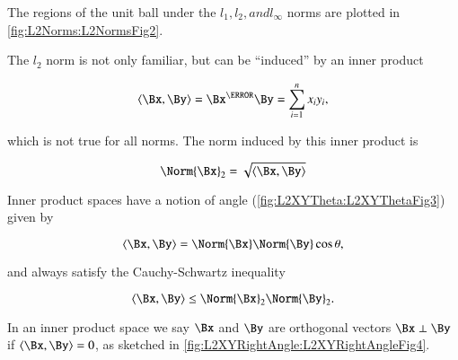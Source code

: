 
The regions of the unit ball under the \( l_1, l_2, and l_\infty \) norms are plotted in \cref{fig:L2Norms:L2NormsFig2}.


The \( l_2 \) norm is not only familiar, but can be ``induced'' by an inner product

\begin{equation}\label{eqn:convex-optimizationLecture2:84}
\innerproduct{\Bx}{\By} = \Bx^\T \By = \sum_{i = 1}^n x_i y_i,
\end{equation}

which is not true for all norms.  The norm induced by this inner product is

\begin{dmath}\label{eqn:convex-optimizationLecture2:104}
\Norm{\Bx}_2 = \sqrt{ \innerproduct{\Bx}{\By} }
\end{dmath}

Inner product spaces have a notion of angle
(\cref{fig:L2XYTheta:L2XYThetaFig3})
given by

\begin{dmath}\label{eqn:convex-optimizationLecture2:124}
\innerproduct{\Bx}{\By} = \Norm{\Bx} \Norm{\By} \cos \theta,
\end{dmath}

and always satisfy the Cauchy-Schwartz inequality

\begin{dmath}\label{eqn:convex-optimizationLecture2:144}
\innerproduct{\Bx}{\By} \le \Norm{\Bx}_2 \Norm{\By}_2.
\end{dmath}

In an inner product space we say \( \Bx \) and \( \By \) are orthogonal vectors \( \Bx \perp \By \) if
\( \innerproduct{\Bx}{\By} = 0 \), as sketched in
\cref{fig:L2XYRightAngle:L2XYRightAngleFig4}.


